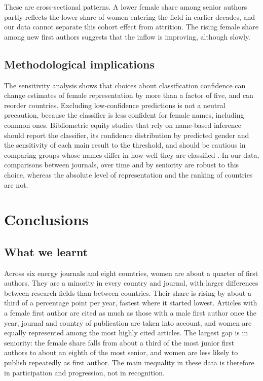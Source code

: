 \documentclass[preprint,12pt,number]{elsarticle}
\begin{document}
These are cross-sectional patterns. A lower female share among senior authors partly reflects the lower share of women entering the field in earlier decades, and our data cannot separate this cohort effect from attrition. The rising female share among new first authors suggests that the inflow is improving, although slowly.

\subsection{Methodological implications}

The sensitivity analysis shows that choices about classification confidence can change estimates of female representation by more than a factor of five, and can reorder countries. Excluding low-confidence predictions is not a neutral precaution, because the classifier is less confident for female names, including common ones. Bibliometric equity studies that rely on name-based inference should report the classifier, its confidence distribution by predicted gender and the sensitivity of each main result to the threshold, and should be cautious in comparing groups whose names differ in how well they are classified \citep{Santamaria2018,Lockhart2023}. In our data, comparisons between journals, over time and by seniority are robust to this choice, whereas the absolute level of representation and the ranking of countries are not.

\section{Conclusions}

\subsection{What we learnt}

Across six energy journals and eight countries, women are about a quarter of first authors. They are a minority in every country and journal, with larger differences between research fields than between countries. Their share is rising by about a third of a percentage point per year, fastest where it started lowest. Articles with a female first author are cited as much as those with a male first author once the year, journal and country of publication are taken into account, and women are equally represented among the most highly cited articles. The largest gap is in seniority: the female share falls from about a third of the most junior first authors to about an eighth of the most senior, and women are less likely to publish repeatedly as first author. The main inequality in these data is therefore in participation and progression, not in recognition.
\end{document}
